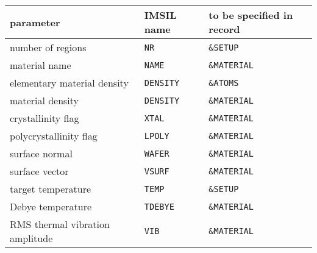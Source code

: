 \begin{center}
\begin{tabular}{lll}
parameter \quad                 & IMSIL name    & to be specified in record \\
\hline
number of regions               & \texttt{NR}        & \texttt{\&SETUP} \\
material name                   & \texttt{NAME}      & \texttt{\&MATERIAL} \\
elementary material density     & \texttt{DENSITY}   & \texttt{\&ATOMS} \\
material density                & \texttt{DENSITY}   & \texttt{\&MATERIAL} \\
crystallinity flag              & \texttt{XTAL}      & \texttt{\&MATERIAL} \\
polycrystallinity flag          & \texttt{LPOLY}     & \texttt{\&MATERIAL} \\
surface normal                  & \texttt{WAFER}     & \texttt{\&MATERIAL} \\
surface vector                  & \texttt{VSURF}     & \texttt{\&MATERIAL} \\
target temperature              & \texttt{TEMP}      & \texttt{\&SETUP} \\
Debye temperature               & \texttt{TDEBYE}    & \texttt{\&MATERIAL} \\
RMS thermal vibration amplitude & \texttt{VIB}       & \texttt{\&MATERIAL} \\

\end{tabular}
\end{center}

